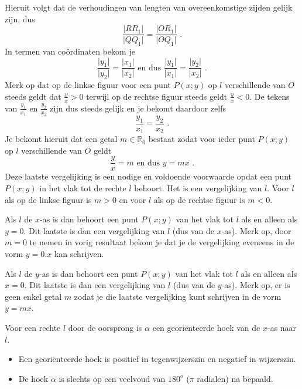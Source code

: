 Hieruit volgt dat de verhoudingen van lengten van overeenkomstige zijden gelijk zijn, dus
\[
\frac {\vert RR_1 \vert}{\vert QQ_1 \vert}=\frac {\vert OR_1 \vert}{\vert OQ_1 \vert} \text { .}
\]
In termen van co\"ordinaten bekom je
\[
\frac {\vert y_1 \vert}{\vert y_2 \vert}=\frac {\vert x_1 \vert}{\vert x_2 \vert} \text { en dus } \frac {\vert y_1 \vert}{\vert x_1 \vert}=\frac {\vert y_2 \vert}{\vert x_2 \vert} \text { .}
\]
Merk op dat op de linkse figuur voor een punt $P(x;y)$ op $l$ verschillende van $O$ steeds geldt dat $\frac {y}{x}>0$ terwijl op de rechtse figuur steeds geldt $\frac {y}{x}<0$.
De tekens van $\frac {y_1}{x_1}$ en $\frac {y_2}{x_2}$ zijn dus steeds gelijk en je bekomt daardoor zelfs
\[
\frac {y_1}{x_1} = \frac{y_2}{x_2} \text { .}
\]
Je bekomt hieruit dat een getal $m \in \mathbb{R}_0$ bestaat zodat voor ieder punt $P(x;y)$ op $l$ verschillende van $O$ geldt
\[
\frac {y}{x}=m \text { en dus } y=mx \text { .}
\]
Deze laatste vergelijking is een nodige en voldoende voorwaarde opdat een punt $P(x;y)$ in het vlak tot de rechte $l$ behoort.
Het is een vergelijking van $l$.
Voor $l$ als op de linkse figuur is $m>0$ en voor $l$ als op de rechtse figuur is $m<0$.

Als $l$ de $x$-as is dan behoort een punt $P(x;y)$ van het vlak tot $l$ als en alleen als $y=0$.
Dit laatste is dan een vergelijking van $l$ (dus van de $x$-as).
Merk op, door $m=0$ te nemen in vorig resultaat bekom je dat je de vergelijking eveneens in de vorm $y=0.x$ kan schrijven.

Als $l$ de $y$-as is dan behoort een punt $P(x;y)$ van het vlak tot $l$ als en alleen als $x=0$.
Dit laatste is dan een vergelijking van $l$ (dus van de $y$-as).
Merk op, er is geen enkel getal $m$ zodat je die laatste vergelijking kunt schrijven in de vorm $y=mx$.

Voor een rechte $l$ door de oorsprong is $\alpha$ een geori\"enteerde hoek van de $x$-as naar $l$.
\begin{itemize}
\item Een geori\"enteerde hoek is positief in tegenwijzerszin en negatief in wijzerszin.
\item De hoek $\alpha$ is slechts op een veelvoud van $180^o$ ($\pi$ radialen) na bepaald.
\end{itemize}

